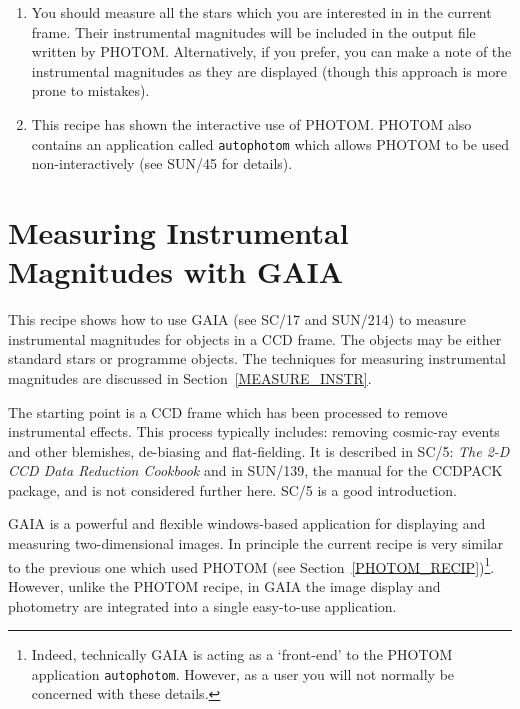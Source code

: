 \documentclass[twoside,11pt]{article}
\newcommand{\xref}[3]{#1}
\newcommand{\xlabel}[1]{}
\begin{document}
\begin{enumerate}
  \item You should measure all the stars which you are interested in in the
   current frame.  Their instrumental magnitudes will be included in the
   output file written by PHOTOM.  Alternatively, if you prefer, you can
   make a note of the instrumental magnitudes as they are displayed
   (though this approach is more prone to mistakes).

  \newpage
  \item This recipe has shown the interactive use of PHOTOM.  PHOTOM also
   contains an application called \xref{{\tt autophotom}}{sun45}{AUTOPHOTOM}
   which allows PHOTOM to be used non-interactively (see
   \xref{SUN/45}{sun45}{}\cite{SUN45} for details).

\end{enumerate}


\newpage
\section{\xlabel{GAIA_RECIP}\label{GAIA_RECIP}Measuring Instrumental
Magnitudes with GAIA}

This recipe shows how to use GAIA (see \xref{SC/17}{sc17}{}\cite{SC17}
and \xref{SUN/214}{sun214}{}\cite{SUN214}) to measure instrumental
magnitudes for objects in a CCD frame.  The objects may be either
standard stars or programme objects.  The techniques for measuring
instrumental magnitudes are discussed in Section~\ref{MEASURE_INSTR}.

The starting point is a CCD frame which has been processed to remove
instrumental effects.  This process typically includes: removing
cosmic-ray events and other blemishes, de-biasing and flat-fielding.  It
is described in \xref{SC/5: {\it The 2-D CCD Data Reduction
Cookbook}}{sc5}{}\/\cite{SC5} and in \xref{SUN/139}{sun139}{}\cite{SUN139},
the manual for the CCDPACK package, and is not considered further here.
SC/5 is a good introduction.

GAIA is a powerful and flexible windows-based application for
displaying and measuring two-dimensional images.  In principle the
current recipe is very similar to the previous one which used PHOTOM (see
Section~\ref{PHOTOM_RECIP})\footnote{Indeed, technically GAIA is acting
as a `front-end' to the PHOTOM application {\tt autophotom}.  However, as
a user you will not normally be concerned with these details.}.
However, unlike the PHOTOM recipe, in GAIA the image display and
photometry are integrated into a single easy-to-use application.
\end{document}
